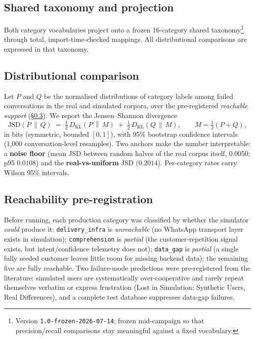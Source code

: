 \documentclass[11pt,a4paper]{article}
\newcommand{\cat}[1]{\texttt{#1}}
\begin{document}
\subsection{Shared taxonomy and projection}
Both category vocabularies project onto a frozen 16-category shared
taxonomy\footnote{Version \texttt{1.0-frozen-2026-07-14}; frozen mid-campaign so that
precision/recall comparisons stay meaningful against a fixed vocabulary.} through total,
import-time-checked mappings.
All distributional comparisons are expressed in that taxonomy.

\subsection{Distributional comparison}
Let $P$ and $Q$ be the normalised distributions of category labels among failed conversations in
the real and simulated corpora, over the pre-registered \emph{reachable support} (\S\ref{sec:reach}).
We report the Jensen--Shannon divergence
\begin{equation}
\mathrm{JSD}(P\,\|\,Q) \;=\; \tfrac{1}{2}\,D_{\mathrm{KL}}\!\left(P \,\middle\|\, M\right)
                        \;+\; \tfrac{1}{2}\,D_{\mathrm{KL}}\!\left(Q \,\middle\|\, M\right),
\qquad M = \tfrac{1}{2}(P+Q),
\end{equation}
in bits (symmetric, bounded $[0,1]$), with 95\% bootstrap confidence intervals (1{,}000
conversation-level resamples). Two anchors make the number interpretable: a \textbf{noise floor}
(mean JSD between random halves of the real corpus itself, $0.0050$; p95 $0.0108$) and the
\textbf{real-vs-uniform} JSD ($0.2014$). Per-category rates carry Wilson 95\% intervals.

\subsection{Reachability pre-registration}
\label{sec:reach}
Before running, each production category was classified by whether the simulator \emph{could}
produce it: \cat{delivery\_infra} is \emph{unreachable} (no WhatsApp transport layer exists in
simulation); \cat{comprehension} is \emph{partial} (the customer-repetition signal exists, but
intent/confidence telemetry does not); \cat{data\_gap} is \emph{partial} (a single fully seeded
customer leaves little room for missing backend data); the remaining five are fully reachable.
Two failure-mode predictions were pre-registered from the literature: simulated users are
systematically over-cooperative and rarely repeat themselves verbatim or express frustration
(Lost in Simulation; Synthetic Users, Real Differences), and a complete test database suppresses
data-gap failures.
\end{document}
